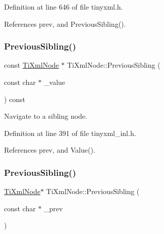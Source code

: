 Definition at line 646 of file tinyxml.\+h.



References prev, and Previous\+Sibling().

\hypertarget{class_ti_xml_node_ace1b618fe58b2b9305fe89bfbc8dd17b}{}\label{class_ti_xml_node_ace1b618fe58b2b9305fe89bfbc8dd17b} 
\subsubsection{\texorpdfstring{Previous\+Sibling()}{PreviousSibling()}\hspace{0.1cm}{\footnotesize\ttfamily [3/6]}}
{\footnotesize\ttfamily const \hyperlink{class_ti_xml_node}{Ti\+Xml\+Node} $\ast$ Ti\+Xml\+Node\+::\+Previous\+Sibling (\begin{DoxyParamCaption}\item[{const char $\ast$}]{\+\_\+value }\end{DoxyParamCaption}) const}



Navigate to a sibling node. 



Definition at line 391 of file tinyxml\+\_\+inl.\+h.



References prev, and Value().

\hypertarget{class_ti_xml_node_a6c977049207177ef21b51972315c2053}{}\label{class_ti_xml_node_a6c977049207177ef21b51972315c2053} 
\subsubsection{\texorpdfstring{Previous\+Sibling()}{PreviousSibling()}\hspace{0.1cm}{\footnotesize\ttfamily [4/6]}}
{\footnotesize\ttfamily \hyperlink{class_ti_xml_node}{Ti\+Xml\+Node}$\ast$ Ti\+Xml\+Node\+::\+Previous\+Sibling (\begin{DoxyParamCaption}\item[{const char $\ast$}]{\+\_\+prev }\end{DoxyParamCaption})\hspace{0.3cm}{\ttfamily [inline]}}



